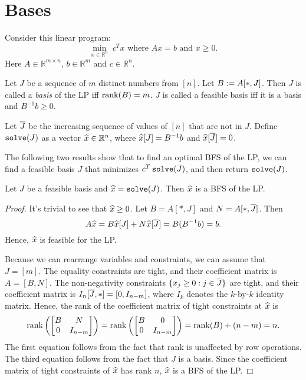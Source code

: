 \section{Bases}

Consider this linear program:
\[ \min_{x \in \mathbb{R}^n}\; c^Tx \textrm{ where } Ax = b \textrm{ and } x \ge 0. \]
Here $A \in \mathbb{R}^{m \times n}$, $b \in \mathbb{R}^m$ and $c \in \mathbb{R}^n$.

\begin{definition}[Basis]
Let $J$ be a sequence of $m$ distinct numbers from $[n]$.
Let $B := A[*,J]$.
Then $J$ is called a \emph{basis} of the LP iff $\operatorname{rank}(B) = m$.
$J$ is called a feasible basis iff it is a basis and $B^{-1}b \ge 0$.

Let $\overline{J}$ be the increasing sequence of values of $[n]$ that are not in $J$.
Define $\operatorname{\mathtt{solve}}(J)$ as a vector $\widehat{x} \in \mathbb{R}^n$,
where $\widehat{x}[J] = B^{-1}b$ and $\widehat{x}[\overline{J}] = 0$.
\end{definition}

The following two results show that to find an optimal BFS of the LP,
we can find a feasible basis $J$ that minimizes $c^T\operatorname{\mathtt{solve}}(J)$, and then return $\operatorname{\mathtt{solve}}(J)$.

\begin{lemma}
\label{thm:basis-gives-bfs}
Let $J$ be a feasible basis and $\widehat{x} = \operatorname{\mathtt{solve}}(J)$.
Then $\widehat{x}$ is a BFS of the LP.
\end{lemma}
\begin{proof}
It's trivial to see that $\widehat{x} \ge 0$. Let $B = A[*,J]$ and $N = A[*,\overline{J}]$. Then
\[ A\widehat{x} = B\widehat{x}[J] + N\widehat{x}[\overline{J}] = B(B^{-1}b) = b. \]
Hence, $\widehat{x}$ is feasible for the LP.

Because we can rearrange variables and constraints, we can assume \wLoG{} that $J = [m]$.
The equality constraints are tight, and their coefficient matrix is $A = [B, N]$.
The non-negativity constraints $\{x_j \ge 0: j \in \overline{J}\}$ are tight,
and their coefficient matrix is $I_n[\overline{J},*] = [0, I_{n-m}]$,
where $I_k$ denotes the $k$-by-$k$ identity matrix.
Hence, the rank of the coefficient matrix of tight constraints at $\widehat{x}$ is
\[ \operatorname{rank}\left(\begin{bmatrix}B & N \\ 0 & I_{n-m}\end{bmatrix}\right)
= \operatorname{rank}\left(\begin{bmatrix}B & 0 \\ 0 & I_{n-m}\end{bmatrix}\right)
= \operatorname{rank}(B) + (n-m) = n. \]
The first equation follows from the fact that rank is unaffected by row operations.
The third equation follows from the fact that $J$ is a basis.
Since the coefficient matrix of tight constraints of $\widehat{x}$ has rank $n$,
$\widehat{x}$ is a BFS of the LP.
\end{proof}

